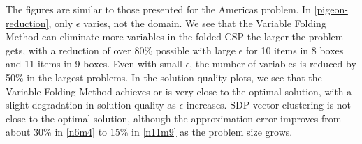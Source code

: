 \documentclass[12pt]{article} %
\begin{document}
 The figures are similar to those presented for the Americas problem. In \autoref{pigeon-reduction}, only $\epsilon$ varies, not the domain. We see that the Variable Folding Method can eliminate more variables in the folded CSP the larger the problem gets, with a reduction of over 80\% possible with large $\epsilon$ for 10 items in 8 boxes and 11 items in 9 boxes. Even with small $\epsilon$, the number of variables is reduced by 50\% in the largest problems. In the solution quality plots, we see that the Variable Folding Method achieves or is very close to the optimal solution, with a slight degradation in solution quality as $\epsilon$ increases. SDP vector clustering is not close to the optimal solution, although the approximation error improves from about 30\% in \ref{n6m4} to 15\% in \ref{n11m9} as the problem size grows.
\end{document}
